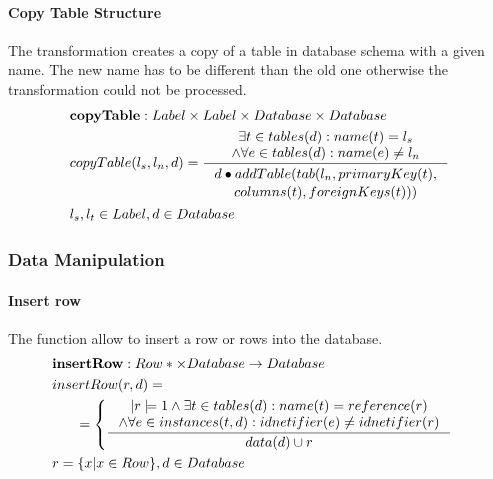 \documentclass[11pt]{article}
\begin{document}
\paragraph{Copy Table Structure} The transformation creates a copy of a table in database schema with a given name. The new name has to be different than the old one otherwise the transformation could not be processed.
\begin{align*}
&	\mathbf{copyTable} : Label \times Label \times Database \times Database \\
&	copyTable(l_s, l_n, d) = \inference{\exists t \in tables(d) : name(t) = l_s \\ \wedge \forall e \in tables(d) : name(e) \neq l_n}{\begin{gathered} d \bullet addTable(tab(l_n, primaryKey(t), \\ 
 columns(t), foreignKeys(t)))
\end{gathered}}\\
& l_s, l_t \in Label,  d \in Database
\end{align*}


\subsubsection{Data Manipulation}
\paragraph{Insert row} The function allow to insert a row or rows into the database.
\begin{align*}
&	\mathbf{insertRow} : Row* \times Database \rightarrow Database \\
&	insertRow(r, d) = \\
& \;\;\;\;\;\; =\begin{cases}
		 	\inference{|r|=1 \wedge \exists t \in tables(d) : name(t) = reference(r) \\ \wedge \forall e \in instances(t, d) : idnetifier(e) \neq idnetifier(r)}{data(d) \cup r} 
		 \end{cases}	\\
&		 r = \{ x | x \in Row\},d \in Database
\end{align*}
\end{document}
